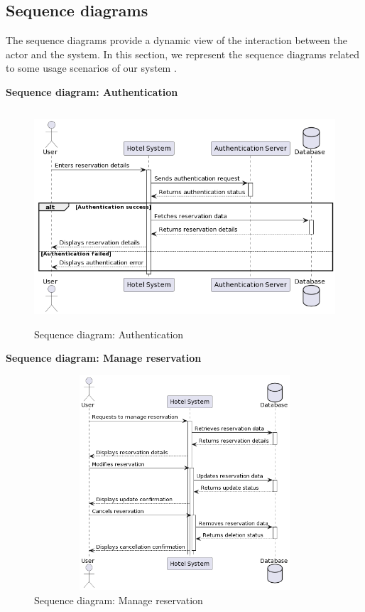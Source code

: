 \subsection{Sequence diagrams   }
The sequence diagrams provide a dynamic view of the interaction between the actor and the system. In this section, we represent the sequence diagrams related to some usage scenarios of our system .
    \item \textbf{Sequence diagram: Authentication }
\begin{figure}[H]
   \centering
    \includegraphics[width=15cm,height=8cm]{images/seq.png}
    \caption{Sequence diagram: Authentication } 
    \label{Sequence diagram: Authentication }
\end{figure}
\item \textbf{Sequence diagram: Manage reservation}

\begin{figure}[H]
   \centering
    \includegraphics[width=15cm,height=8cm]{images/seq2.png}
    \caption{Sequence diagram: Manage reservation } 
    \label{Sequence diagram: Manage reservation  }
\end{figure}

